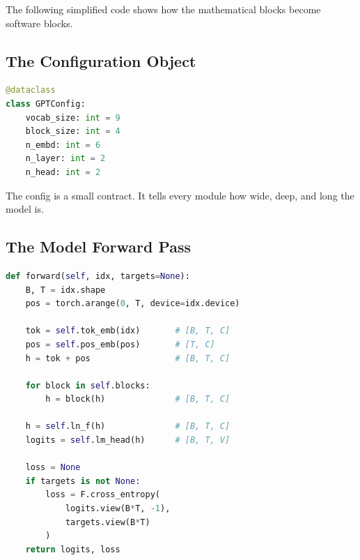 The following simplified code shows how the mathematical blocks become software blocks.

\subsection{The Configuration Object}

\begin{lstlisting}[language=Python]
@dataclass
class GPTConfig:
    vocab_size: int = 9
    block_size: int = 4
    n_embd: int = 6
    n_layer: int = 2
    n_head: int = 2
\end{lstlisting}

The config is a small contract. It tells every module how wide, deep, and long the model is.

\subsection{The Model Forward Pass}

\begin{lstlisting}[language=Python]
def forward(self, idx, targets=None):
    B, T = idx.shape
    pos = torch.arange(0, T, device=idx.device)

    tok = self.tok_emb(idx)       # [B, T, C]
    pos = self.pos_emb(pos)       # [T, C]
    h = tok + pos                 # [B, T, C]

    for block in self.blocks:
        h = block(h)              # [B, T, C]

    h = self.ln_f(h)              # [B, T, C]
    logits = self.lm_head(h)      # [B, T, V]

    loss = None
    if targets is not None:
        loss = F.cross_entropy(
            logits.view(B*T, -1),
            targets.view(B*T)
        )
    return logits, loss
\end{lstlisting}

\begin{center}
\end{center}

